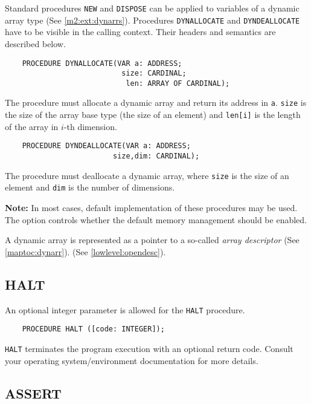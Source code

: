 Standard procedures {\tt NEW} and {\tt DISPOSE} can be applied to
variables of a dynamic array type (See \ref{m2:ext:dynarrs}).
Procedures {\tt DYNALLOCATE} and {\tt DYNDEALLOCATE} have to be visible
in the calling context. Their headers and semantics are described below.

\begin{verbatim}
    PROCEDURE DYNALLOCATE(VAR a: ADDRESS;
                           size: CARDINAL;
                            len: ARRAY OF CARDINAL);
\end{verbatim}

The procedure must allocate a dynamic array and return its address in \verb'a'.
\verb|size| is the size of the array base type (the size of an element)
and \verb|len[i]| is the length of the array in $i$-th dimension.

\begin{verbatim}
    PROCEDURE DYNDEALLOCATE(VAR a: ADDRESS;
                         size,dim: CARDINAL);
\end{verbatim}

The procedure must deallocate a dynamic array,
where \verb|size| is the size of an element and \verb|dim|
is the number of dimensions.

{\bf Note:} In most cases, default implementation of these procedures
may be used. The  option controls whether the default
memory management should be enabled.

A dynamic array is represented as a pointer to a so-called {\it array
descriptor}
\ifgenc (See \ref{maptoc:dynarr}). \fi
\ifgencode (See \ref{lowlevel:opendesc}). \fi

\subsection{HALT}\label{m2:ext:HALT}
\mextonly

An optional integer parameter is allowed for the \verb'HALT' procedure.

\verb'    PROCEDURE HALT ([code: INTEGER]);'

\verb|HALT| terminates the program execution with an optional return code.
Consult your operating system/environment documentation for more details.

\subsection{ASSERT}\label{m2:ext:ASSERT}
\mextonly

